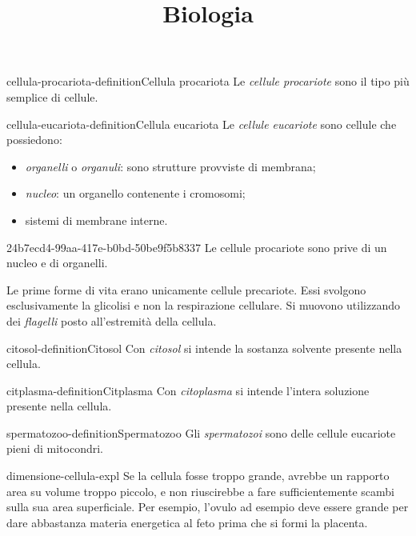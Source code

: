 \documentclass[preview]{standalone}
\begin{document}
\title{Biologia}
\genpage

\begin{snippetdefinition}{cellula-procariota-definition}{Cellula procariota}
    Le \textit{cellule procariote} sono il tipo più semplice di cellule.
\end{snippetdefinition}

\begin{snippetdefinition}{cellula-eucariota-definition}{Cellula eucariota}
    Le \textit{cellule eucariote} sono cellule
    che possiedono:
    \begin{itemize}
        \item \textit{organelli} o \textit{organuli}: sono strutture provviste di membrana;
        \item \textit{nucleo}: un organello contenente i cromosomi;
        \item sistemi di membrane interne.
    \end{itemize}
\end{snippetdefinition}

\begin{snippet}{24b7ecd4-99aa-417e-b0bd-50be9f5b8337}
    Le cellule procariote sono prive di un nucleo e di organelli.

    Le prime forme di vita erano unicamente cellule precariote.
    Essi svolgono esclusivamente la glicolisi e non la respirazione cellulare.
    Si muovono utilizzando dei \textit{flagelli} posto all'estremità della cellula.
\end{snippet}


\begin{snippetdefinition}{citosol-definition}{Citosol}
    Con \textit{citosol} si intende la sostanza solvente presente nella cellula.
\end{snippetdefinition}

\begin{snippetdefinition}{citplasma-definition}{Citplasma}
    Con \textit{citoplasma} si intende l'intera soluzione presente nella cellula.
\end{snippetdefinition}

\begin{snippetdefinition}{spermatozoo-definition}{Spermatozoo}
    Gli \textit{spermatozoi} sono delle cellule eucariote pieni di mitocondri.
\end{snippetdefinition}

\begin{snippet}{dimensione-cellula-expl}
    Se la cellula fosse troppo grande, avrebbe un rapporto area su volume troppo piccolo, e non riuscirebbe
    a fare sufficientemente scambi sulla sua area superficiale.
    Per esempio, l'ovulo ad esempio deve essere grande per dare
    abbastanza materia energetica al feto prima che si
    formi la placenta.
\end{snippet}
\end{document}
